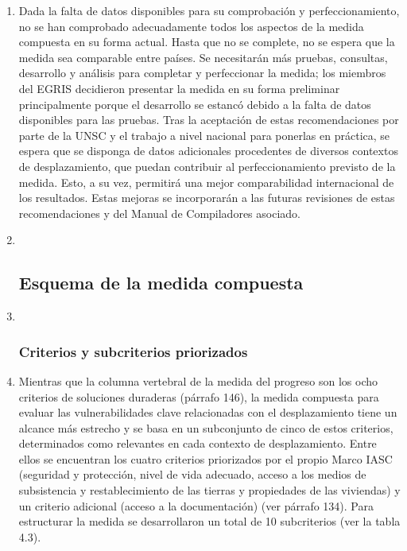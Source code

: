 \documentclass[
]{book}
\begin{document}
\begin{enumerate}
\def\labelenumi{\arabic{enumi}.}
\item
  Dada la falta de datos disponibles para su comprobación y perfeccionamiento, no se han comprobado adecuadamente todos los aspectos de la medida compuesta en su forma actual. Hasta que no se complete, no se espera que la medida sea comparable entre países. Se necesitarán más pruebas, consultas, desarrollo y análisis para completar y perfeccionar la medida; los miembros del EGRIS decidieron presentar la medida en su forma preliminar principalmente porque el desarrollo se estancó debido a la falta de datos disponibles para las pruebas. Tras la aceptación de estas recomendaciones por parte de la UNSC y el trabajo a nivel nacional para ponerlas en práctica, se espera que se disponga de datos adicionales procedentes de diversos contextos de desplazamiento, que puedan contribuir al perfeccionamiento previsto de la medida. Esto, a su vez, permitirá una mejor comparabilidad internacional de los resultados. Estas mejoras se incorporarán a las futuras revisiones de estas recomendaciones y del Manual de Compiladores asociado.
\item ~
  \hypertarget{esquema-de-la-medida-compuesta}{%
  \subsection{Esquema de la medida compuesta}\label{esquema-de-la-medida-compuesta}}
\item ~
  \hypertarget{criterios-y-subcriterios-priorizados}{%
  \subsubsection{Criterios y subcriterios priorizados}\label{criterios-y-subcriterios-priorizados}}
\item
  Mientras que la columna vertebral de la medida del progreso son los ocho criterios de soluciones duraderas (párrafo 146), la medida compuesta para evaluar las vulnerabilidades clave relacionadas con el desplazamiento tiene un alcance más estrecho y se basa en un subconjunto de cinco de estos criterios, determinados como relevantes en cada contexto de desplazamiento. Entre ellos se encuentran los cuatro criterios priorizados por el propio Marco IASC (seguridad y protección, nivel de vida adecuado, acceso a los medios de subsistencia y restablecimiento de las tierras y propiedades de las viviendas) y un criterio adicional (acceso a la documentación) (ver párrafo 134). Para estructurar la medida se desarrollaron un total de 10 subcriterios (ver la tabla 4.3).
\end{enumerate}
\end{document}
